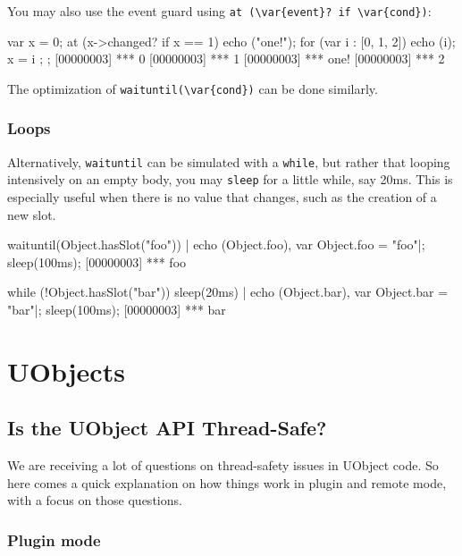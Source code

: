 You may also use the event guard using %
\lstinline|at (\var{event}? if \var{cond})|:

\clearpage
\begin{urbiscript}
{
  var x = 0;
  at (x->changed? if x == 1)
      echo ("one!");
  for (var i : [0, 1, 2])
  {
    echo (i);
    x = i
  };
};
[00000003] *** 0
[00000003] *** 1
[00000003] *** one!
[00000003] *** 2
\end{urbiscript}

The optimization of \lstinline|waituntil(\var{cond})| can be done
similarly.

\subsubsection{Loops}

Alternatively, \lstinline|waituntil| can be simulated with a
\lstinline|while|, but rather that looping intensively on an empty
body, you may \lstinline|sleep| for a little while, say 20ms.  This is
especially useful when there is no value that changes, such as the
creation of a new slot.

\begin{urbiscript}
waituntil(Object.hasSlot("foo")) | echo (Object.foo),
var Object.foo = "foo"|;
sleep(100ms);
[00000003] *** foo
\end{urbiscript}

\begin{urbiscript}
while (!Object.hasSlot("bar"))
  sleep(20ms) |
echo (Object.bar),
var Object.bar = "bar"|;
sleep(100ms);
[00000003] *** bar
\end{urbiscript}

\section{UObjects}
\subsection{Is the UObject API Thread-Safe?}
We are receiving a lot of questions on thread-safety issues in UObject
code. So here comes a quick explanation on how things work in plugin
and remote mode, with a focus on those questions.

\subsubsection{Plugin mode}

